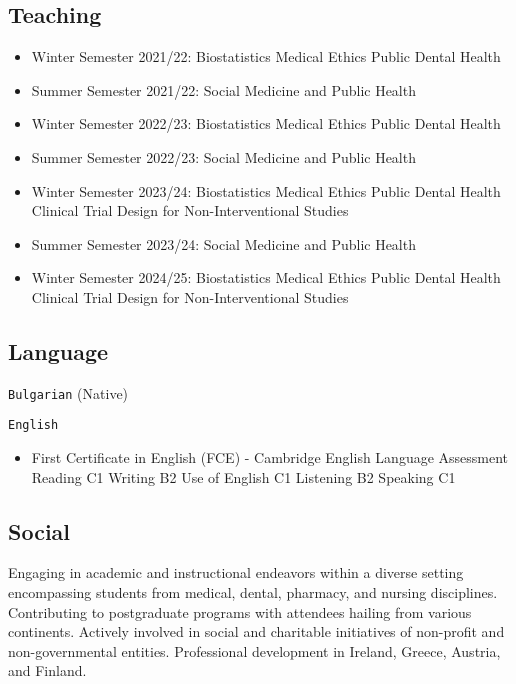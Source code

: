 \documentclass[
  12pt,
  letterpaper,
  DIV=11,
  numbers=noendperiod]{scrartcl}
\providecommand{\tightlist}{%
  \setlength{\itemsep}{0pt}\setlength{\parskip}{0pt}}\usepackage{longtable,booktabs,array}
\begin{document}
\subsection{Teaching}\label{teaching}

\begin{itemize}
\item
  Winter Semester 2021/22: Biostatistics \textbar{} Medical Ethics
  \textbar{} Public Dental Health
\item
  Summer Semester 2021/22: Social Medicine and Public Health
\item
  Winter Semester 2022/23: Biostatistics \textbar{} Medical Ethics
  \textbar{} Public Dental Health
\item
  Summer Semester 2022/23: Social Medicine and Public Health
\item
  Winter Semester 2023/24: Biostatistics \textbar{} Medical Ethics
  \textbar{} Public Dental Health \textbar{} Clinical Trial Design for
  Non-Interventional Studies
\item
  Summer Semester 2023/24: Social Medicine and Public Health
\item
  Winter Semester 2024/25: Biostatistics \textbar{} Medical Ethics
  \textbar{} Public Dental Health \textbar{} Clinical Trial Design for
  Non-Interventional Studies
\end{itemize}

\subsection{Language}\label{language}

\texttt{Bulgarian} (Native)

\texttt{English}

\begin{itemize}
\tightlist
\item
  First Certificate in English (FCE) - Cambridge English Language
  Assessment \textbar{} Reading C1 \textbar{} Writing B2 \textbar{} Use
  of English C1 \textbar{} Listening B2 \textbar{} Speaking C1
\end{itemize}

\subsection{Social}\label{social}

Engaging in academic and instructional endeavors within a diverse
setting encompassing students from medical, dental, pharmacy, and
nursing disciplines. Contributing to postgraduate programs with
attendees hailing from various continents. Actively involved in social
and charitable initiatives of non-profit and non-governmental entities.
Professional development in Ireland, Greece, Austria, and Finland.
\end{document}
